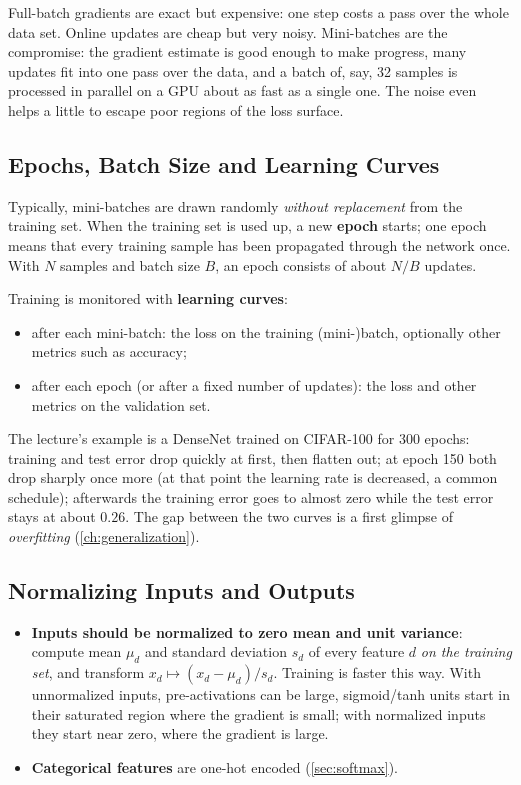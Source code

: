 \documentclass[11pt, oneside]{book}
\let\originalsubsection\subsection
\renewcommand{\subsection}{\Needspace{6\baselineskip}\originalsubsection}
\begin{document}
\begin{intbox}
Full-batch gradients are exact but expensive: one step costs a pass over the
whole data set. Online updates are cheap but very noisy. Mini-batches are
the compromise: the gradient estimate is good enough to make progress,
many updates fit into one pass over the data, and a batch of, say, 32
samples is processed in parallel on a GPU about as fast as a single one.
The noise even helps a little to escape poor regions of the loss surface.
\end{intbox}

\subsection{Epochs, Batch Size and Learning Curves}

Typically, mini-batches are drawn randomly \emph{without replacement} from
the training set. When the training set is used up, a new \textbf{epoch}
starts; one epoch means that every training sample has been propagated
through the network once. With $N$ samples and batch size $B$, an epoch
consists of about $N/B$ updates.

Training is monitored with \textbf{learning curves}:
\begin{itemize}
  \item after each mini-batch: the loss on the training (mini-)batch,
    optionally other metrics such as accuracy;
  \item after each epoch (or after a fixed number of updates): the loss and
    other metrics on the validation set.
\end{itemize}
The lecture's example is a DenseNet trained on CIFAR-100 for 300 epochs:
training and test error drop quickly at first, then flatten out; at epoch 150
both drop sharply once more (at that point the learning rate is decreased,
a common schedule); afterwards the training error goes to almost zero while
the test error stays at about $0.26$. The gap between the two curves is a
first glimpse of \emph{overfitting} (\cref{ch:generalization}).

\subsection{Normalizing Inputs and Outputs}

\begin{itemize}
  \item \textbf{Inputs should be normalized to zero mean and unit variance}:
    compute mean $\mu_d$ and standard deviation $s_d$ of every feature $d$
    \emph{on the training set}, and transform $x_d \mapsto (x_d - \mu_d)/s_d$.
    Training is faster this way. With unnormalized inputs, pre-activations
    can be large, sigmoid/tanh units start in their saturated region where
    the gradient is small; with normalized inputs they start near zero,
    where the gradient is large.
  \item \textbf{Categorical features} are one-hot encoded (\cref{sec:softmax}).
\end{itemize}
\end{document}

